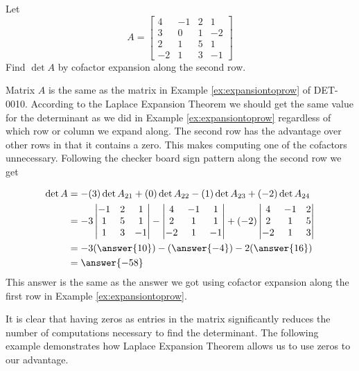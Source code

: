 \documentclass{ximera}
\begin{document}
 \begin{example}\label{ex:laplace1}
Let  
$$A=\begin{bmatrix}4&-1&2&1\\3&0&1&-2\\
2&1&5&1\\-2&1&3&-1\end{bmatrix}$$
Find $\det{A}$ by cofactor expansion along the second row.
\begin{explanation}
Matrix $A$ is the same as the matrix in Example \ref{ex:expansiontoprow} of DET-0010.  According to the Laplace Expansion Theorem we should get the same value for the determinant as we did in Example \ref{ex:expansiontoprow} regardless of which row or column we expand along.  The second row has the advantage over other rows in that it contains a zero.  This makes computing one of the cofactors unnecessary.  Following the checker board sign pattern along the second row we get

\begin{align*}
\det{A}&=-(3)\det{A_{21}}+(0)\det{A_{22}}-(1)\det{A_{23}}+(-2)\det{A_{24}}\\
&=-3\begin{vmatrix}-1&2&1\\1&5&1\\1&3&-1\end{vmatrix}-\begin{vmatrix}4&-1&1\\2&1&1\\-2&1&-1\end{vmatrix}+(-2)\begin{vmatrix}4&-1&2\\2&1&5\\-2&1&3\end{vmatrix}\\&=-3(\answer{10})-(\answer{-4})-2(\answer{16})\\
&=\answer{-58}
\end{align*}
This answer is the same as the answer we got using cofactor expansion along the first row in Example \ref{ex:expansiontoprow}.
\end{explanation}
 \end{example}
 
It is clear that having zeros as entries in the matrix significantly reduces the number of computations necessary to find the determinant.  The following example demonstrates how Laplace Expansion Theorem allows us to use zeros to our advantage.
\end{document}
